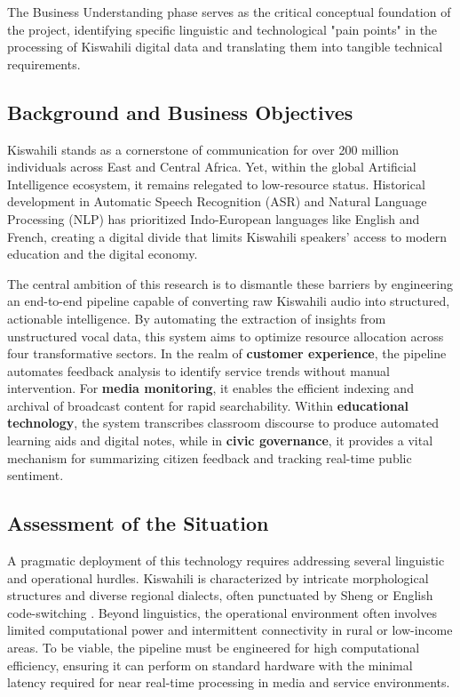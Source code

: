 The Business Understanding phase serves as the critical conceptual foundation of the project, identifying specific linguistic and technological "pain points" in the processing of Kiswahili digital data and translating them into tangible technical requirements.

\subsection{Background and Business Objectives}
Kiswahili stands as a cornerstone of communication for over 200 million individuals across East and Central Africa. Yet, within the global Artificial Intelligence ecosystem, it remains relegated to low-resource status. Historical development in Automatic Speech Recognition (ASR) and Natural Language Processing (NLP) has prioritized Indo-European languages like English and French, creating a digital divide that limits Kiswahili speakers' access to modern education and the digital economy. 

The central ambition of this research is to dismantle these barriers by engineering an end-to-end pipeline capable of converting raw Kiswahili audio into structured, actionable intelligence. By automating the extraction of insights from unstructured vocal data, this system aims to optimize resource allocation across four transformative sectors. In the realm of \textbf{customer experience}, the pipeline automates feedback analysis to identify service trends without manual intervention. For \textbf{media monitoring}, it enables the efficient indexing and archival of broadcast content for rapid searchability. Within \textbf{educational technology}, the system transcribes classroom discourse to produce automated learning aids and digital notes, while in \textbf{civic governance}, it provides a vital mechanism for summarizing citizen feedback and tracking real-time public sentiment.

\subsection{Assessment of the Situation}
A pragmatic deployment of this technology requires addressing several linguistic and operational hurdles. Kiswahili is characterized by intricate morphological structures and diverse regional dialects, often punctuated by Sheng or English code-switching \citep{Abdullah_Rusli_2021}. Beyond linguistics, the operational environment often involves limited computational power and intermittent connectivity in rural or low-income areas. To be viable, the pipeline must be engineered for high computational efficiency, ensuring it can perform on standard hardware with the minimal latency required for near real-time processing in media and service environments.

